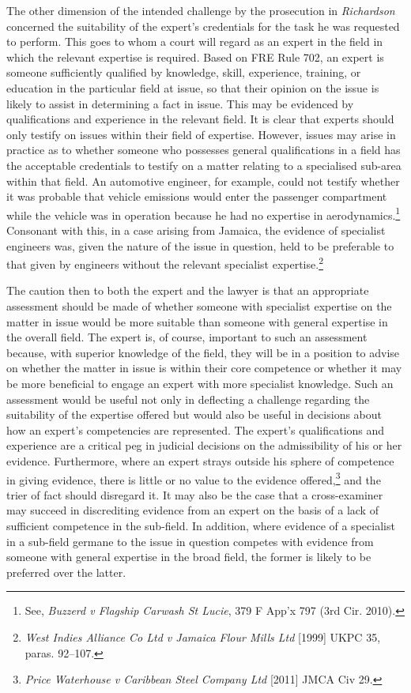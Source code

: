 \documentclass[output=paper,colorlinks,citecolor=brown]{langscibook}
\begin{document}
The other dimension of the intended challenge by the prosecution in \emph{Richardson} concerned the suitability of the expert’s credentials for the task he was requested to perform. This goes to whom a court will regard as an expert in the field in which the relevant expertise is required. Based on FRE Rule 702, an expert is someone sufficiently qualified by knowledge, skill, experience, training, or education in the particular field at issue, so that their opinion on the issue is likely to assist in determining a fact in issue.  This may be evidenced by qualifications and experience in the relevant field. It is clear that experts should only testify on issues within their field of expertise.  However, issues may arise in practice as to whether someone who possesses general qualifications in a field has the acceptable credentials to testify on a matter relating to a specialised sub-area within that field.  An automotive engineer, for example, could not testify whether it was probable that vehicle emissions would enter the passenger compartment while the vehicle was in operation because he had no expertise in aerodynamics.\footnote{See, \emph{Buzzerd v Flagship Carwash St Lucie}, 379 F App’x 797 (3rd Cir. 2010).} Consonant with this, in a case arising from Jamaica, the evidence of specialist engineers was, given the nature of the issue in question, held to be preferable to that given by engineers without the relevant specialist expertise.\footnote{\emph{West Indies Alliance Co Ltd v Jamaica Flour Mills Ltd} [1999] UKPC 35, paras. 92--107. }   

The caution then to both the expert and the lawyer is that an appropriate assessment should be made of whether someone with specialist expertise on the matter in issue would be more suitable than someone with general expertise in the overall field. The expert is, of course, important to such an assessment because, with superior knowledge of the field, they will be in a position to advise on whether the matter in issue is within their core competence or whether it may be more beneficial to engage an expert with more specialist knowledge. Such an assessment would be useful not only in deflecting a challenge regarding the suitability of the expertise offered but would also be useful in decisions about how an expert’s competencies are represented. The expert’s qualifications and experience are a critical peg in judicial decisions on the admissibility of his or her evidence. Furthermore, where an expert strays outside his sphere of competence in giving evidence, there is little or no value to the evidence offered,\footnote{\emph{Price Waterhouse v Caribbean Steel Company Ltd} [2011] JMCA Civ 29.} and the trier of fact should disregard it. It may also be the case that a cross-examiner may succeed in discrediting evidence from an expert on the basis of a lack of sufficient competence in the sub-field. In addition, where evidence of a specialist in a sub-field germane to the issue in question competes with evidence from someone with general expertise in the broad field, the former is likely to be preferred over the latter.
\end{document}
